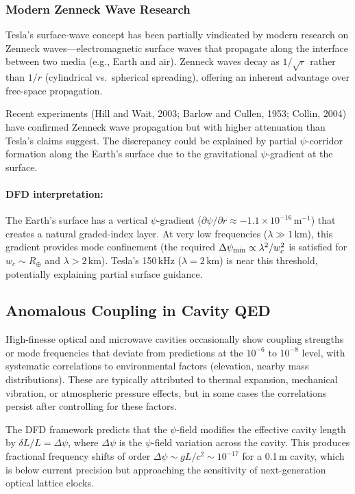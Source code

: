 \documentclass[11pt,a4paper]{article}
\begin{document}
\subsubsection{Modern Zenneck Wave Research}

Tesla's surface-wave concept has been partially vindicated by modern
research on Zenneck waves---electromagnetic surface waves that
propagate along the interface between two media (e.g., Earth and air).
Zenneck waves decay as $1/\sqrt{r}$ rather than $1/r$ (cylindrical
vs.\ spherical spreading), offering an inherent advantage over
free-space propagation.

Recent experiments (Hill and Wait, 2003; Barlow and Cullen, 1953;
Collin, 2004) have confirmed Zenneck wave propagation but with
higher attenuation than Tesla's claims suggest. The discrepancy
could be explained by partial $\psi$-corridor formation along the
Earth's surface due to the gravitational $\psi$-gradient at the
surface.

\paragraph{DFD interpretation:} The Earth's surface has a vertical
$\psi$-gradient ($\partial\psi/\partial r \approx -1.1 \times
10^{-16}\,\text{m}^{-1}$) that creates a natural graded-index
layer. At very low frequencies ($\lambda \gg 1\,\text{km}$), this
gradient provides mode confinement (the required $\Delta\psi_{\rm min}
\propto \lambda^2/w_c^2$ is satisfied for $w_c \sim R_\oplus$ and
$\lambda > 2\,\text{km}$). Tesla's 150\,kHz ($\lambda = 2\,\text{km}$)
is near this threshold, potentially explaining partial surface
guidance.

\subsection{Anomalous Coupling in Cavity QED}

High-finesse optical and microwave cavities occasionally show
coupling strengths or mode frequencies that deviate from predictions
at the $10^{-6}$ to $10^{-8}$ level, with systematic correlations
to environmental factors (elevation, nearby mass distributions).
These are typically attributed to thermal expansion, mechanical
vibration, or atmospheric pressure effects, but in some cases the
correlations persist after controlling for these factors.

The DFD framework predicts that the $\psi$-field modifies the
effective cavity length by $\delta L/L = \Delta\psi$, where
$\Delta\psi$ is the $\psi$-field variation across the cavity.
This produces fractional frequency shifts of order
$\Delta\psi \sim gL/c^2 \sim 10^{-17}$ for a 0.1\,m cavity,
which is below current precision but approaching the sensitivity
of next-generation optical lattice clocks.
\end{document}

